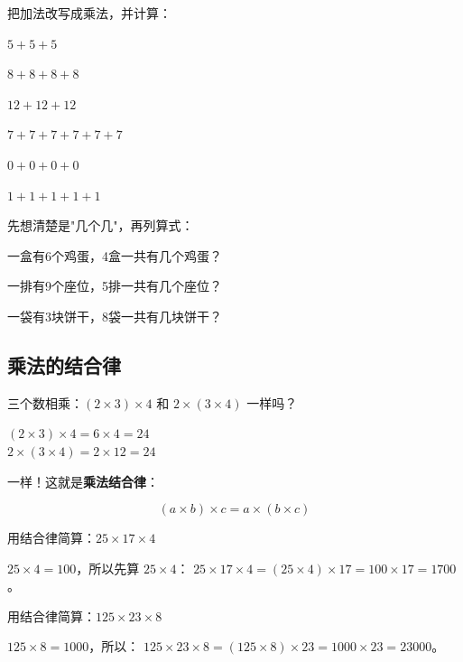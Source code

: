 \begin{exercise}
\item 把加法改写成乘法，并计算：
  \begin{subexercise}
    \item $5+5+5$
    \item $8+8+8+8$
    \item $12+12+12$
    \item $7+7+7+7+7+7$
    \item $0+0+0+0$
    \item $1+1+1+1+1$
  \end{subexercise}

\item 先想清楚是"几个几"，再列算式：
  \begin{subexercise}
    \item 一盒有6个鸡蛋，4盒一共有几个鸡蛋？
    \item 一排有9个座位，5排一共有几个座位？
    \item 一袋有3块饼干，8袋一共有几块饼干？
  \end{subexercise}
\end{exercise}

\subsection*{乘法的结合律}

三个数相乘：$(2\times3)\times4$ 和 $2\times(3\times4)$ 一样吗？

$(2\times3)\times4 = 6\times4 = 24$ \\
$2\times(3\times4) = 2\times12 = 24$

一样！这就是\textbf{乘法结合律}：

\[
(a\times b)\times c = a\times(b\times c)
\]

\begin{example}
用结合律简算：$25\times17\times4$
\end{example}
\begin{solution}
$25\times4=100$，所以先算 $25\times4$：
$25\times17\times4 = (25\times4)\times17 = 100\times17 = 1700$。
\end{solution}

\begin{example}
用结合律简算：$125\times23\times8$
\end{example}
\begin{solution}
$125\times8=1000$，所以：
$125\times23\times8 = (125\times8)\times23 = 1000\times23 = 23000$。
\end{solution}

